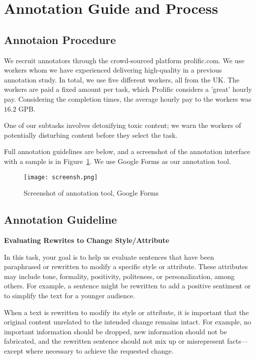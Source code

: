 \section{Annotation Guide and Process}
\label{app:anno}
\subsection{Annotaion Procedure}
We recruit annotators through the crowd-sourced platform prolific.com. We use workers whom we have experienced delivering high-quality in a previous annotation study. In total, we use five different workers, all from the UK. The workers are paid a fixed amount per task, which Prolific considers a 'great' hourly pay. Considering the completion times, the average hourly pay to the workers was $16.2$ GPB.  

One of our subtasks involves detoxifying toxic content; we warn the workers of potentially disturbing content before they select the task.


Full annotation guidelines are below, and a screenshot of the annotation interface with a sample is in Figure~\ref{fig:screenl}. We use Google Forms as our annotation tool. 
\begin{figure}
    \centering  \texttt{[image: screensh.png]}
    \caption{Screenshot of annotation tool, Google Forms}
    \label{fig:screenl}
\end{figure}


\subsection{Annotation Guideline}
\textbf{Evaluating Rewrites to Change Style/Attribute}

In this task, your goal is to help us evaluate sentences that have been paraphrased or rewritten to modify a specific style or attribute. These attributes may include tone, formality, positivity, politeness, or personalization, among others. For example, a sentence might be rewritten to add a positive sentiment or to simplify the text for a younger audience.

When a text is rewritten to modify its style or attribute, it is important that the original content unrelated to the intended change remains intact. For example, no important information should be dropped, new information should not be fabricated, and the rewritten sentence should not mix up or misrepresent facts—except where necessary to achieve the requested change.

